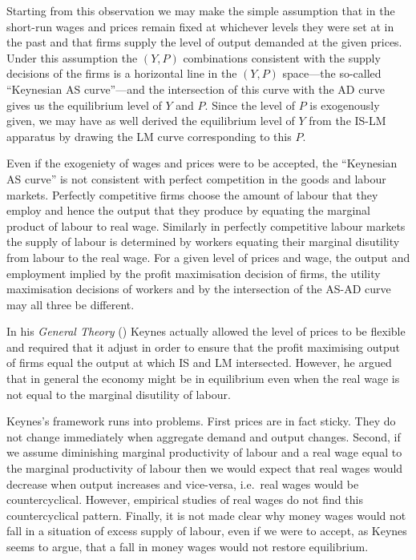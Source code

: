 \documentclass[11pt,reqno,openany]{amsbook}
\begin{document}
Starting from this observation we may make the simple
assumption that in the short-run wages and prices remain
fixed at whichever levels they were set at in the past and
that firms supply the level of output demanded at the given
prices. Under this assumption the $(Y,P)$ combinations
consistent with the supply decisions of the firms is a
horizontal line in the $(Y,P)$ space---the so-called
``Keynesian AS curve''---and
the intersection of this curve with the AD curve gives us
the equilibrium level of $Y$ and $P$. Since the level of $P$
is exogenously given, we may have as well derived the
equilibrium level of $Y$ from the IS-LM apparatus by drawing
the LM curve corresponding to this $P$.

Even if the exogeniety of wages and prices were to be
accepted, the ``Keynesian AS curve'' is not consistent with perfect
competition in the goods and labour markets. Perfectly
competitive firms choose the amount of labour that they
employ and hence the output that they produce by equating the
marginal product of labour to real wage. Similarly in
perfectly competitive labour markets the supply of labour is
determined by workers equating their marginal disutility
from labour to the real wage. For a given level of prices
and wage, the output and employment
implied by the profit maximisation decision of firms, the
utility maximisation decisions of workers and by the
intersection of the AS-AD curve may all three be different.

In his \textit{General Theory} (\cite{keynes-gt}) Keynes
actually allowed the level of prices to be flexible and
required that it adjust in order to ensure that the profit
maximising output of firms equal the output at which IS and
LM intersected. However, he argued that in general the
economy might be in equilibrium even when the real wage is
not equal to the marginal disutility of labour.

Keynes's framework runs into problems. First
prices are in fact sticky. They do not change immediately
when aggregate demand and output changes. Second, if we
assume diminishing marginal productivity of labour and a
real wage equal to the marginal productivity of labour then
we would expect that real wages would decrease when output
increases and vice-versa, i.e.\ real wages would be
countercyclical. However, empirical studies of real wages do
not find this countercyclical pattern. Finally, it is not
made clear why money wages would not fall in a situation of
excess supply of labour, even if we were to accept, as
Keynes seems to argue, that a fall in money wages would not
restore equilibrium.
\end{document}
